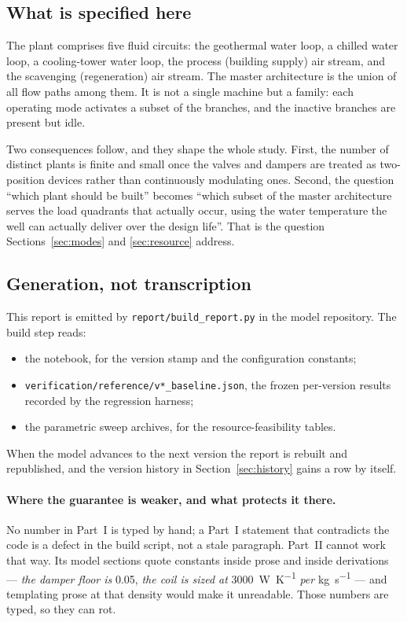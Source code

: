 \documentclass[11pt]{article}
\begin{document}
\subsection{What is specified here}

The plant comprises five fluid circuits: the geothermal water loop, a chilled
water loop, a cooling-tower water loop, the process (building supply) air
stream, and the scavenging (regeneration) air stream. The master architecture
is the union of all flow paths among them. It is not a single machine but a
family: each operating mode activates a subset of the branches, and the
inactive branches are present but idle.

Two consequences follow, and they shape the whole study. First, the number of
distinct plants is finite and small once the valves and dampers are treated as
two-position devices rather than continuously modulating ones. Second, the
question ``which plant should be built'' becomes ``which subset of the master
architecture serves the load quadrants that actually occur, using the water
temperature the well can actually deliver over the design life''. That is the
question Sections~\ref{sec:modes} and \ref{sec:resource} address.

\subsection{Generation, not transcription}

This report is emitted by \verb|report/build_report.py| in the model
repository. The build step reads:

\begin{itemize}[nosep]
  \item the notebook, for the version stamp and the configuration constants;
  \item \verb|verification/reference/v*_baseline.json|, the frozen per-version
        results recorded by the regression harness;
  \item the parametric sweep archives, for the resource-feasibility tables.
\end{itemize}

When the model advances to the next version the report is rebuilt and
republished, and the version history in Section~\ref{sec:history} gains a row
by itself.

\paragraph{Where the guarantee is weaker, and what protects it there.}
No number in Part~I is typed by hand; a Part~I statement that contradicts the
code is a defect in the build script, not a stale paragraph. Part~II cannot
work that way. Its model sections quote constants inside prose and inside
derivations --- \emph{the damper floor is} \num{0.05}, \emph{the coil is sized
at} \SI{3000}{\watt\per\kelvin} \emph{per} \si{\kilogram\per\second} --- and
templating prose at that density would make it unreadable. Those numbers are
typed, so they can rot.
\end{document}
